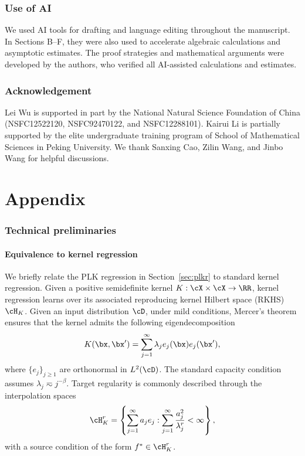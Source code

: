 \documentclass[11pt]{article}
\begin{document}
\section*{Use of AI}
We used AI tools for drafting and language editing throughout the manuscript. In Sections B--F, they were also used to accelerate algebraic calculations and asymptotic estimates. The proof strategies and mathematical arguments were developed by the authors, who verified all AI-assisted calculations and estimates.

\section*{Acknowledgement}
Lei Wu is supported in part by the National Natural Science Foundation of China (NSFC12522120, NSFC92470122, and NSFC12288101). Kairui Li is partially supported by the elite undergraduate training program of School of Mathematical Sciences in Peking University. We thank  Sanxing Cao, Zilin Wang, and Jinbo Wang for helpful discussions. 





\newpage


\appendix
\part{Appendix}
\parttoc

\newpage
\section{Technical preliminaries}
\subsection{Equivalence to kernel regression}

We briefly relate the PLK regression in Section~\ref{sec:plkr} to standard kernel regression. Given a positive semidefinite kernel \(K:\cX\times\cX\to\RR\), kernel regression learns over its associated reproducing kernel Hilbert space (RKHS) \(\cH_K\).  Given an input distribution $\cD$, under mild conditions, Mercer's theorem ensures that the kernel admits the following eigendecomposition
\[
K(\bx,\bx')
=
\sum_{j=1}^\infty \lambda_j e_j(\bx) e_j(\bx'),
\]
where \(\{e_j\}_{j\geq1}\) are orthonormal in \(L^2(\cD)\). The standard capacity condition assumes \(\lambda_j\eqsim j^{-\beta}\). Target regularity is commonly described through the interpolation spaces
\[
\cH_K^r
=
\left\{
\sum_{j=1}^\infty a_j e_j:
\sum_{j=1}^\infty \frac{a_j^2}{\lambda_j^r}<\infty
\right\},
\]
with a source condition of the form \(f^*\in\cH_K^r\).
\end{document}

